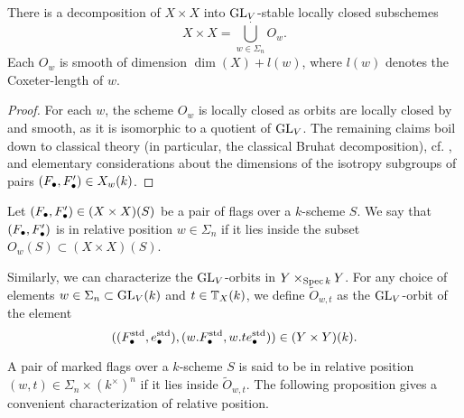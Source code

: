 \documentclass[../main.tex]{subfiles}
\begin{document}
\begin{prop}\label{prop:BruhatDecomp}
  There is a decomposition of 
  $X \times X$ into $\operatorname{GL}_V$-stable locally closed subschemes
  \begin{equation*}
    X \times X = \bigcup_{w \in \Sigma_n}^{\cdot} O_w.
  \end{equation*}
  Each $O_w$ is smooth of dimension $\dim(X) + l(w)$, where $l(w)$ denotes the
  Coxeter-length of $w$.
\begin{proof}
   For each $w$, the scheme $O_w$ is locally closed as orbits are locally
   closed by \cite[Proposition 1.65 b)]{milne2017algebraic} and smooth,
   as it is isomorphic to a quotient of $\operatorname{GL}_V$. The remaining claims
   boil down to classical theory (in particular, the classical Bruhat decomposition),
   cf. \cite[Chapter 21]{milne2017algebraic}, and elementary considerations about 
   the dimensions of the isotropy subgroups of pairs $(F_\bullet, F_\bullet') \in X_w(k)$.
\end{proof}
\end{prop}

Let $(F_\bullet, F_\bullet') \in (X \times X)(S)$ be a pair of flags over a $k$-scheme
$S$. We say that $(F_\bullet,F_\bullet')$ is in relative position 
$w \in \Sigma_n$ if it lies inside the subset $O_w(S) \subset (X \times X)(S)$. 

Similarly, we can characterize the $\operatorname{GL}_V$-orbits in $Y \times_{\operatorname{Spec} k} Y$.
For any choice of elements $w \in \Sigma_n \subset \operatorname{GL}_V(k)$ and $t \in
\mathbb{T}_X(k)$, we define $\tilde O_{w,t}$ as the $\operatorname{GL}_V$-orbit of the element
$$((F_\bullet^{\mathrm{std}}, e_\bullet^{\mathrm{std}}), (w.F_\bullet^{\mathrm{std}}, w.te_\bullet^{\mathrm{std}})) \in (Y
\times Y)(k).$$ 

A pair of marked flags over a $k$-scheme $S$ is said to be in relative position
$(w,t) \in \Sigma_n \times (k^\times)^n$ if it lies inside $\tilde O_{w,t}$.
The following proposition gives a convenient characterization of relative position.
\end{document}
